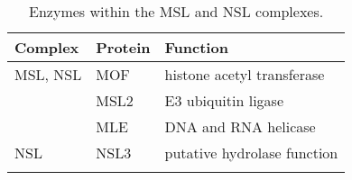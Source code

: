\begin{minipage}{\textwidth} %
\begin{singlespacing}
\begin{small}
\setlength{\extrarowheight}{1.5pt}
\vspace*{-2em}
\begin{longtable}[l]{>{\textsf\bgroup}p{2cm}<{\egroup}>{\textsf\bgroup}p{2cm}<{\egroup} >{\textsf\bgroup}p{4cm}<{\egroup}} %
\caption[Enzymes within the MSL and NSL complexes.]{\textsf{Enzymes within the MSL and NSL complexes.}} \\ %
\textbf{Complex} & \textbf{Protein} & \textbf{Function}
\tabularnewline
\toprule
MSL, NSL & MOF & histone acetyl transferase
\tabularnewline \midrule
\multirow{2}{*}{MSL} 	& MSL2 & E3 ubiquitin ligase \\
											& MLE & DNA and RNA helicase
\tabularnewline \midrule
NSL & NSL3 & putative hydrolase function 
\tabularnewline \bottomrule
\label{tab:enzymes}
\end{longtable}
\end{small}
\end{singlespacing}
\end{minipage}

